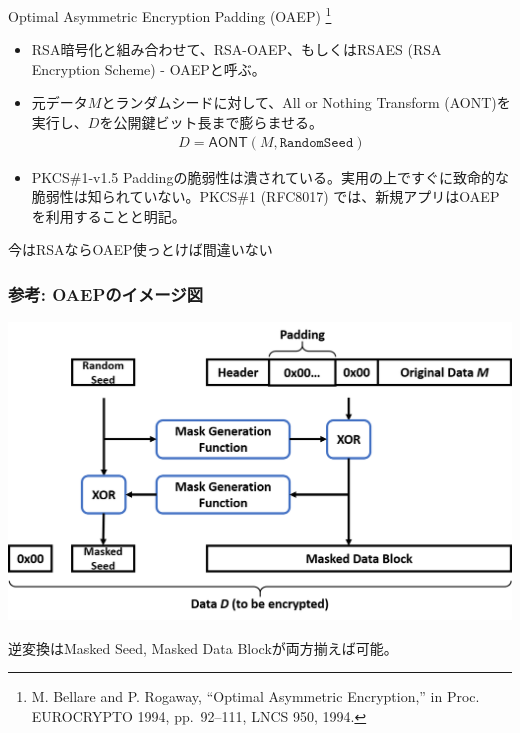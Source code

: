 \documentclass[12pt,dvipdfmx]{beamer}
\begin{document}
\begin{frame}

\begin{block}{\small Optimal Asymmetric Encryption Padding (OAEP) \footnote[frame]{\scriptsize M. Bellare and P. Rogaway, ``Optimal Asymmetric Encryption,'' in Proc. EUROCRYPTO 1994, pp.~92--111, LNCS 950, 1994.}}
\small
\begin{itemize}
 \item RSA暗号化と組み合わせて、RSA-OAEP、もしくはRSAES (RSA Encryption Scheme) - OAEPと呼ぶ。
 \item 元データ$M$とランダムシードに対して、All or Nothing Transform (AONT)を実行し、$D$を公開鍵ビット長まで膨らませる。
\begin{align*}
 D = \textsf{AONT}(M, \texttt{RandomSeed})
\end{align*}
 \item PKCS\#1-v1.5 Paddingの脆弱性は潰されている。実用の上ですぐに致命的な脆弱性は知られていない。PKCS\#1 (RFC8017) では、\alert{新規アプリはOAEPを利用すること}と明記。
\end{itemize}
\end{block}

\begin{center}
 {\Large \alert{今はRSAならOAEP使っとけば間違いない}}
\end{center}
\end{frame}

\begin{frame}
\frametitle{参考: OAEPのイメージ図}
\begin{center}
 \includegraphics[width=\linewidth]{Figs/oaep.png}
\end{center}
逆変換はMasked Seed, Masked Data Blockが両方揃えば可能。
\end{frame}
\end{document}

